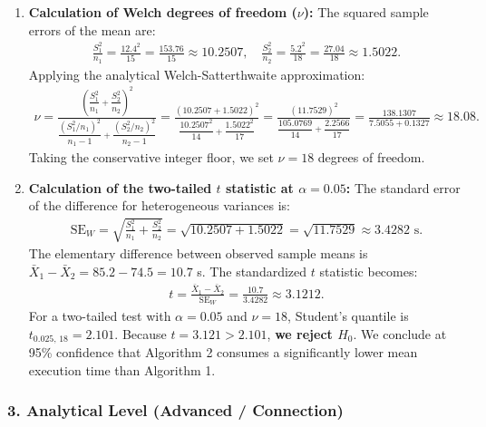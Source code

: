 \begin{solucion}
	\begin{enumerate}
		\item \textbf{Calculation of Welch degrees of freedom ($\nu$):}
		The squared sample errors of the mean are:
		\begin{align}
			\frac{S_1^2}{n_1} = \frac{12.4^2}{15} = \frac{153.76}{15} \approx 10.2507, \quad \frac{S_2^2}{n_2} = \frac{5.2^2}{18} = \frac{27.04}{18} \approx 1.5022.
		\end{align}
		Applying the analytical Welch-Satterthwaite approximation:
		\begin{align}
			\nu = \frac{\left( \dfrac{S_1^2}{n_1} + \dfrac{S_2^2}{n_2} \right)^2}{\dfrac{(S_1^2 / n_1)^2}{n_1 - 1} + \dfrac{(S_2^2 / n_2)^2}{n_2 - 1}} = \frac{(10.2507 + 1.5022)^2}{\dfrac{10.2507^2}{14} + \dfrac{1.5022^2}{17}} = \frac{(11.7529)^2}{\dfrac{105.0769}{14} + \dfrac{2.2566}{17}} = \frac{138.1307}{7.5055 + 0.1327} \approx 18.08.
		\end{align}
		Taking the conservative integer floor, we set $\nu = 18$ degrees of freedom.
		
		\item \textbf{Calculation of the two-tailed $t$ statistic at $\alpha = 0.05$:}
		The standard error of the difference for heterogeneous variances is:
		\begin{align}
			\text{SE}_W = \sqrt{ \frac{S_1^2}{n_1} + \frac{S_2^2}{n_2} } = \sqrt{ 10.2507 + 1.5022 } = \sqrt{11.7529} \approx 3.4282 \text{ s.}
		\end{align}
		The elementary difference between observed sample means is $\bar{X}_1 - \bar{X}_2 = 85.2 - 74.5 = 10.7$ s. The standardized $t$ statistic becomes:
		\begin{align}
			t = \frac{\bar{X}_1 - \bar{X}_2}{\text{SE}_W} = \frac{10.7}{3.4282} \approx 3.1212.
		\end{align}
		For a two-tailed test with $\alpha = 0.05$ and $\nu = 18$, Student's quantile is $t_{0.025, \, 18} = 2.101$.
		Because $t = 3.121 > 2.101$, \textbf{we reject $H_0$}. We conclude at 95\% confidence that Algorithm 2 consumes a significantly lower mean execution time than Algorithm 1.
	\end{enumerate}
\end{solucion}

\subsubsection*{3. Analytical Level (Advanced / Connection)}

